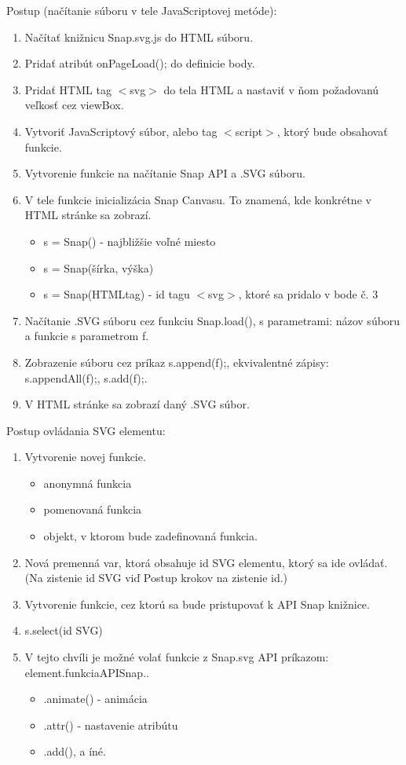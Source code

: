 Postup (načítanie súboru v tele JavaScriptovej metóde): 
\begin{enumerate}
	\item Načítať knižnicu Snap.svg.js do HTML súboru. 
	\item Pridať atribút onPageLoad(); do definicie body.
	\item Pridať HTML tag $<$svg$>$ do tela HTML a nastaviť v ňom požadovanú veľkosť cez viewBox.
	\item Vytvoriť JavaScriptový súbor, alebo tag $<$script$>$, ktorý bude obsahovať funkcie. 
	\item Vytvorenie funkcie na načítanie Snap API a .SVG súboru. 
	\item V tele funkcie inicializácia Snap Canvasu. To znamená, kde konkrétne v HTML stránke sa zobrazí.
	\begin{itemize}
		\item s = Snap() - najbližšie voľné miesto
		\item s = Snap(šírka, výška) 
		\item s = Snap(HTMLtag) - id tagu $<$svg$>$, ktoré sa pridalo v bode č. 3
	\end{itemize}
	\item Načítanie .SVG súboru cez funkciu Snap.load(), s parametrami: názov súboru a funkcie s parametrom f. 
	\item Zobrazenie súboru cez príkaz s.append(f);, ekvivalentné zápisy: s.appendAll(f);, s.add(f);. 
	\item V HTML stránke sa zobrazí daný .SVG súbor. 
	
	
\end{enumerate}

Postup ovládania SVG elementu:

\begin{enumerate}
	\item Vytvorenie novej funkcie. 
	\begin{itemize}
		\item anonymná funkcia 
		\item pomenovaná funkcia
		\item objekt, v ktorom bude zadefinovaná funkcia. 
	\end{itemize}
	\item Nová premenná var, ktorá obsahuje id SVG elementu, ktorý sa ide ovládať. (Na zistenie id SVG viď Postup krokov na zistenie id.)
	\item Vytvorenie funkcie, cez ktorú sa bude pristupovať k API Snap knižnice. 
	\item s.select(id SVG)
	\item V tejto chvíli je možné volať funkcie z Snap.svg API príkazom: element.funkciaAPISnap.. 
	\begin{itemize}
		\item .animate() - animácia
		\item .attr() - nastavenie atribútu
		\item .add(), a íné.	
	\end{itemize}	
\end{enumerate}


